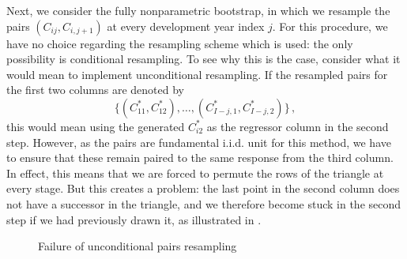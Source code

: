 \documentclass[a4paper]{book}
\begin{document}
Next, we consider the fully nonparametric bootstrap, in which we resample the pairs \linebreak
$(C_{ij}, C_{i, j + 1})$ at every development year index $j$. For this procedure, we have no choice regarding the resampling scheme which is used: the only possibility is conditional resampling. To see why this is the case, consider what it would mean to implement unconditional resampling. If the resampled pairs for the first two columns are denoted by
\begin{displaymath}
\{ (C^*_{11}, C^*_{12}), \dots, (C^*_{I - j, 1}, C^*_{I - j, 2}) \} \,,
\end{displaymath}
this would mean using the generated $C^*_{i2}$ as the regressor column in the second step. However, as the pairs are fundamental i.i.d. unit for this method, we have to ensure that these remain paired to the same response from the third column. In effect, this means that we are forced to permute the rows of the triangle at every stage. But this creates a problem: the last point in the second column does not have a successor in the triangle, and we therefore become stuck in the second step if we had previously drawn it, as illustrated in . 
\begin{figure}[!htb]
  \centering
  \caption{Failure of unconditional pairs resampling}
  \label{fig:uncond-pairs-resample}
\end{figure}
\end{document}
